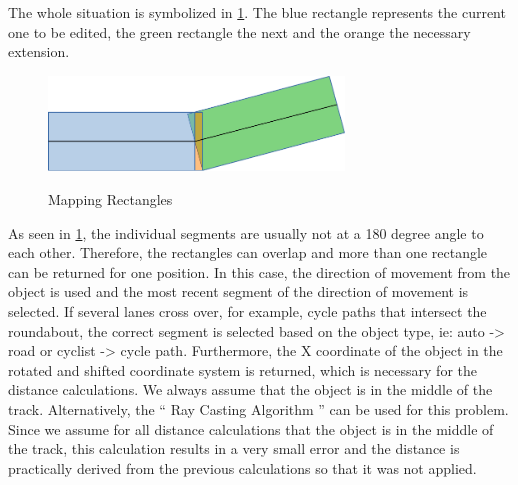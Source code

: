 \documentclass[11pt,oneside,openright]{mpreport}
\begin{document}
The whole situation is symbolized in \cref{mapping}. The blue rectangle represents the current one to be edited, the green rectangle the next and the orange the necessary extension.
\begin{figure}[!ht]
\begin{center}
\caption{Mapping Rectangles}
\includegraphics[width=0.7\textwidth]{bilder/mapping.pdf}
\label{mapping}
\end{center}
\end{figure}

As seen in \cref{mapping}, the individual segments are usually not at a 180 degree angle to each other. Therefore, the rectangles can overlap and more than one rectangle can 
be returned for one position. In this case, the direction of movement from the object is used and the most recent segment of the direction of movement is selected.
If several lanes cross over, for example, cycle paths that intersect the roundabout, the correct segment is selected based on the object type, ie: auto -> road or cyclist -> cycle path.
Furthermore, the X coordinate of the object in the rotated and shifted coordinate system is returned, which is necessary for the distance calculations. We always assume that the
object is in the middle of the track. Alternatively, the `` Ray Casting Algorithm '' \cite{Galetzka2017} can be used for this problem. Since we assume for all
distance calculations that the object is in the middle of the track, this calculation results in a very small error and the distance is practically derived from the
previous calculations so that it was not applied.
\end{document}
